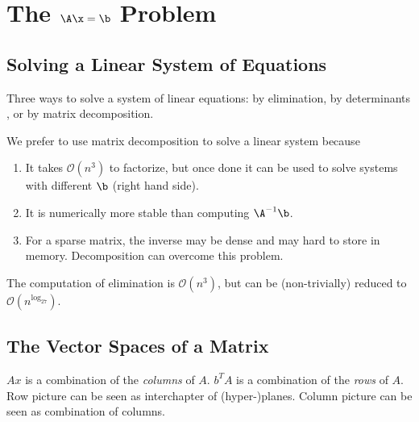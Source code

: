 {\chapter{The $\A\x=\b$ Problem}
\section{Solving a Linear System of Equations}
\begin{rmk}
	Three ways to solve a system of linear equations: by elimination, by determinants {\color{red}{(Cramer's Rule???)}}, or by matrix decomposition.
\end{rmk}

\begin{rmk}
	We prefer to use matrix decomposition to solve a linear system because
	\begin{enumerate}
		\item It takes $\mathcal{O}(n^3)$ to factorize, but once done it can be used to solve systems with different $\b$ (right hand side).
		\item It is numerically more stable than computing $\A^{-1}\b$.
		\item For a sparse matrix, the inverse may be dense and may hard to store in memory. Decomposition can overcome this problem.
	\end{enumerate}
\end{rmk}

\begin{rmk}
	The computation of elimination is $\mathcal{O}(n^3)$, but can be (non-trivially) reduced to $\mathcal{O}(n^{\log_27})$.
\end{rmk}

\section{The Vector Spaces of a Matrix}
\begin{rmk}
	$Ax$ is a combination of the {\em{columns}} of $A$. $b^TA$ is a combination of the {\em{rows}} of $A$. Row picture can be seen as interchapter of (hyper-)planes. Column picture can be seen as combination of columns.
\end{rmk}

}
